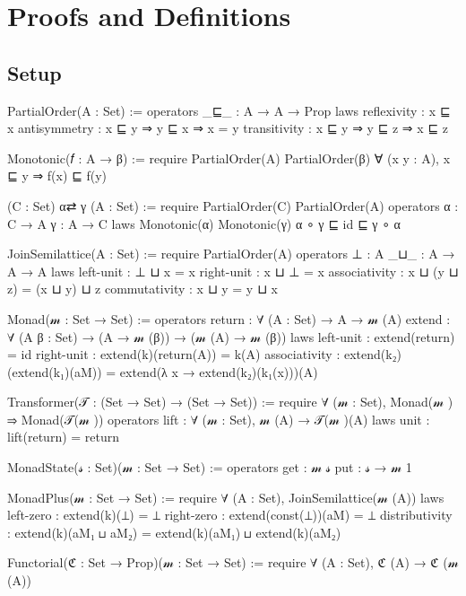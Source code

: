\documentclass{article}
\begin{document}


\section{Proofs and Definitions}
\label{section:Proofs+Definitions}


\subsection{Setup}
\label{section:Proofs+Definitions:Setup}

PartialOrder(A : Set) :=
  operators
    _⊑_ : A → A → Prop
  laws
    reflexivity : x ⊑ x
    antisymmetry : x ⊑ y ⇒  y ⊑ x ⇒  x = y
    transitivity : x ⊑ y ⇒  y ⊑ z ⇒  x ⊑ z

Monotonic(𝑓 : A → β) := 
  require
    PartialOrder(A)
    PartialOrder(β)
    ∀ (x y : A), x ⊑ y ⇒  f(x) ⊑ f(y)

(C : Set) α⇄ γ (A : Set) :=
  require
    PartialOrder(C)
    PartialOrder(A)
  operators
    α : C → A
    γ : A → C
  laws
    Monotonic(α)
    Monotonic(γ)
    α ∘ γ ⊑ id ⊑ γ ∘ α

JoinSemilattice(A : Set) :=
  require
    PartialOrder(A)
  operators
    ⊥ : A
    _⊔_ : A → A → A
  laws
    left-unit : ⊥ ⊔ x = x
    right-unit : x ⊔ ⊥ = x
    associativity : x ⊔ (y ⊔ z) = (x ⊔ y) ⊔ z
    commutativity : x ⊔ y = y ⊔ x

Monad(𝓂  : Set → Set) :=
  operators
    return : ∀ (A : Set) → A → 𝓂 (A)
    extend : ∀ (A β : Set) → (A → 𝓂 (β)) → (𝓂 (A) → 𝓂 (β))
  laws
    left-unit : extend(return) = id
    right-unit : extend(k)(return(A)) = k(A)
    associativity : extend(k₂)(extend(k₁)(aM)) = extend(λ x → extend(k₂)(k₁(x)))(A)

Transformer(𝒯 : (Set → Set) → (Set → Set)) :=
  require
    ∀ (𝓂  : Set), Monad(𝓂 ) ⇒  Monad(𝒯(𝓂 ))
  operators
    lift : ∀ (𝓂  : Set), 𝓂 (A) → 𝒯(𝓂 )(A)
  laws
    unit : lift(return) = return

MonadState(𝓈 : Set)(𝓂  : Set → Set) :=
  operators
    get : 𝓂  𝓈
    put : 𝓈 → 𝓂  1

MonadPlus(𝓂  : Set → Set) := 
  require
    ∀ (A : Set), JoinSemilattice(𝓂 (A))
  laws
    left-zero : extend(k)(⊥) = ⊥
    right-zero : extend(const(⊥))(aM) = ⊥
    distributivity : extend(k)(aM₁ ⊔ aM₂) = extend(k)(aM₁) ⊔ extend(k)(aM₂)

Functorial(ℭ : Set → Prop)(𝓂  : Set → Set) := 
  require
    ∀ (A : Set), ℭ (A) → ℭ (𝓂 (A))
\end{document}
